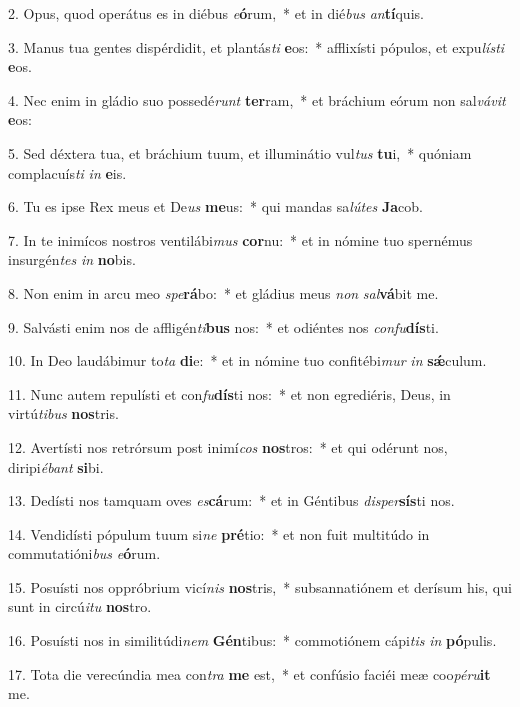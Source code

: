 2. Opus, quod operátus es in diébus \textit{e}\textbf{ó}rum,~*  et in dié\textit{bus} \textit{an}\textbf{tí}quis.\

3. Manus tua gentes dispérdidit, et plantás\textit{ti} \textbf{e}os:~*  afflixísti pópulos, et expu\textit{lís}\textit{ti} \textbf{e}os.\

4. Nec enim in gládio suo possedé\textit{runt} \textbf{ter}ram,~*  et bráchium eórum non sal\textit{vá}\textit{vit} \textbf{e}os:\

5. Sed déxtera tua, et bráchium tuum, et illuminátio vul\textit{tus} \textbf{tu}i,~*  quóniam complacuís\textit{ti} \textit{in} \textbf{e}is.\

6. Tu es ipse Rex meus et De\textit{us} \textbf{me}us:~*  qui mandas sa\textit{lú}\textit{tes} \textbf{Ja}cob.\

7. In te inimícos nostros ventilábi\textit{mus} \textbf{cor}nu:~*  et in nómine tuo spernémus insurgén\textit{tes} \textit{in} \textbf{no}bis.\

8. Non enim in arcu meo \textit{spe}\textbf{rá}bo:~*  et gládius meus \textit{non} \textit{sal}\textbf{vá}bit me.\

9. Salvásti enim nos de affligén\textit{ti}\textbf{bus} nos:~*  et odiéntes nos \textit{con}\textit{fu}\textbf{dís}ti.\

10. In Deo laudábimur to\textit{ta} \textbf{di}e:~*  et in nómine tuo confitébi\textit{mur} \textit{in} \textbf{sǽ}culum.\

11. Nunc autem repulísti et con\textit{fu}\textbf{dís}ti nos:~*  et non egrediéris, Deus, in virtú\textit{ti}\textit{bus} \textbf{nos}tris.\

12. Avertísti nos retrórsum post inimí\textit{cos} \textbf{nos}tros:~*  et qui odérunt nos, diripi\textit{é}\textit{bant} \textbf{si}bi.\

13. Dedísti nos tamquam oves \textit{es}\textbf{cá}rum:~*  et in Géntibus \textit{di}\textit{sper}\textbf{sís}ti nos.\

14. Vendidísti pópulum tuum si\textit{ne} \textbf{pré}tio:~*  et non fuit multitúdo in commutatióni\textit{bus} \textit{e}\textbf{ó}rum.\

15. Posuísti nos oppróbrium vicí\textit{nis} \textbf{nos}tris,~*  subsannatiónem et derísum his, qui sunt in circú\textit{i}\textit{tu} \textbf{nos}tro.\

16. Posuísti nos in similitúdi\textit{nem} \textbf{Gén}tibus:~*  commotiónem cápi\textit{tis} \textit{in} \textbf{pó}pulis.\

17. Tota die verecúndia mea con\textit{tra} \textbf{me} est,~*  et confúsio faciéi meæ coo\textit{pé}\textit{ru}\textbf{it} me.\

